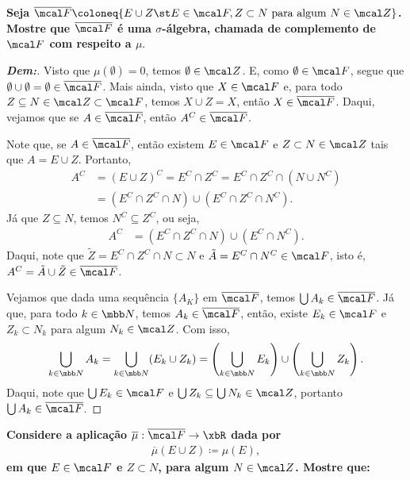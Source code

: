 \biglinend 
{}
\bigline
\textbf{Seja $\overline{\mcal F} \coloneq \{E\cup Z\st E \in \mcal F, Z \subset N\text{ para algum }N\in \mcal Z\}$.
Mostre que $\overline{\mcal F}$ é uma $\sigma$-álgebra, chamada de complemento de $\mcal F$ com respeito a $\mu$}.
\begin{proof}[\textbf{Dem:}]
Visto que $\mu(\emptyset) = 0$, temos $\emptyset \in \mcal Z$. E, como $\emptyset \in \mcal F$, segue que 
  $\emptyset \cup \emptyset = \emptyset \in \overline{\mcal F}$. Mais ainda, visto que $X \in \mcal F$ e, 
  para todo $Z \subseteq N \in \mcal Z \subset \mcal F$, temos $X \cup Z = X$, então $X \in \overline{\mcal F}$. 
  Daqui, vejamos que se $A \in \overline{\mcal F}$, então $A^C \in \overline{\mcal F}$.
  
  \noindent 
  Note que, se $A \in \overline{\mcal F}$, então existem $E \in
  \mcal F$ e $Z \subset N\in\mcal Z$
  tais que $A = E \cup Z$. Portanto, 
  \begin{align*}
    A^C &= (E \cup Z)^C = E^C \cap Z^C = E^C\cap Z^C \cap (N \cup N^C)\\
    &= (E^C \cap Z^C \cap N) \cup (E^C \cap Z^C \cap N^C).
  \end{align*}
  Já que $Z \subseteq N$, temos $N^C \subseteq Z^C$, ou seja, 
  \begin{align*}
    A^C &= (E^C \cap Z^C \cap N) \cup (E^C \cap N^C).
  \end{align*}
  Daqui, note que $\tilde Z = E^C \cap Z^C \cap N \subset N$ e $\tilde A = E^C \cap N^C \in 
  \mcal F$, isto é, $A^C = \tilde A \cup \tilde Z \in \overline{\mcal F}$. 

  \noindent
  Vejamos que dada uma sequência $\{A_K\}$ em $\overline{\mcal F}$,
  temos $\bigcup A_k \in \overline{\mcal F}$. Já que, para todo 
  $k \in \mbb N$, temos $A_k \in \overline{\mcal F}$, então, existe $E_k \in \mcal F$ e 
  $Z_k \subset N_k$ para algum $N_k \in \mcal Z$. Com isso, 
  \begin{align*}
    \bigcup_{k \in \mbb N} A_k = \bigcup_{k \in \mbb N} (E_k \cup Z_k) = 
    \left(\bigcup_{k \in \mbb N} E_k \right)\cup \left(\bigcup_{k \in \mbb N} Z_k\right).
  \end{align*}
  Daqui, note que $\bigcup E_k \in \mcal F$ e $\bigcup Z_k \subseteq 
  \bigcup N_k \in \mcal Z$, portanto $\bigcup A_k \in \overline{\mcal F}$.
\end{proof}
\biglinend 
{}
\bigline
\textbf{Considere a aplicação $\overline \mu: \overline{\mcal F} \rightarrow \xbR$ dada por 
\begin{align*}
  \overline \mu (E\cup Z) \coloneq \mu(E),
\end{align*}
em que $E\in \mcal F$ e $Z \subset N$, para algum $N \in \mcal Z$. Mostre que:} 
